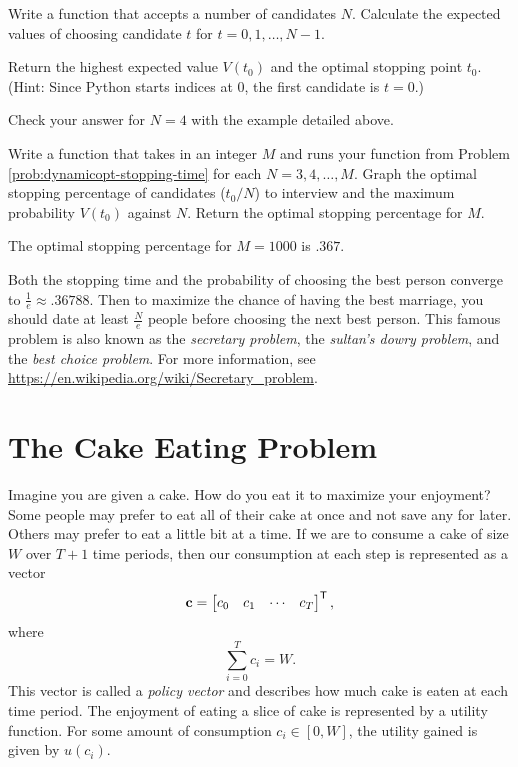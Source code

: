 \begin{problem}
Write a function that accepts a number of candidates $N$.
Calculate the expected values of choosing candidate $t$ for $t=0,1,\ldots,N-1$.

Return the highest expected value $V(t_0)$ and the optimal stopping point $t_0$.
\\(Hint: Since Python starts indices at $0$, the first candidate is $t=0$.)

Check your answer for $N=4$ with the example detailed above.
\label{prob:dynamicopt-stopping-time}
\end{problem}

\begin{problem}
Write a function that takes in an integer $M$ and runs your function from Problem \ref{prob:dynamicopt-stopping-time} for each $N=3,4,\ldots,M$.
Graph the optimal stopping percentage of candidates ($t_0/N$) to interview and the maximum probability $V(t_0)$ against $N$.
Return the optimal stopping percentage for $M$.

The optimal stopping percentage for $M=1000$ is $.367$.
\end{problem}

Both the stopping time and the probability of choosing the best person converge to $\frac{1}{e} \approx .36788$.
Then to maximize the chance of having the best marriage, you should date at least $\frac{N}{e}$ people before choosing the next best person.
This famous problem is also known as the \emph{secretary problem}, the \emph{sultan's dowry problem}, and the \emph{best choice problem}.
For more information, see \url{https://en.wikipedia.org/wiki/Secretary_problem}.

\section*{The Cake Eating Problem} %

Imagine you are given a cake.
How do you eat it to maximize your enjoyment?
Some people may prefer to eat all of their cake at once and not save any for later.
Others may prefer to eat a little bit at a time.
If we are to consume a cake of size $W$ over $T+1$ time periods, then our consumption at each step is represented as a vector
\[
\mathbf{c}=\begin{bmatrix}c_0 & c_1 & \cdots & c_T\end{bmatrix}^{\mathsf T},
\]
where
\[
\sum_{i=0}^T c_i = W.
\]
This vector is called a \emph{policy vector} and describes how much cake is eaten at each time period.
The enjoyment of eating a slice of cake is represented by a utility function.
For some amount of consumption $c_i \in [0, W]$, the utility gained is given by
$u(c_i)$.

